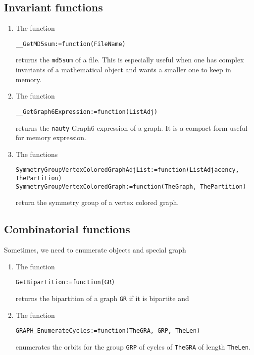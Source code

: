 \documentclass[12pt]{amsart}
\begin{document}
\subsection{Invariant functions}

\begin{enumerate}
\item The function
\begin{verbatim}
__GetMD5sum:=function(FileName)
\end{verbatim}
returns the {\tt md5sum} of a file.
This is especially useful when one has complex
invariants of a mathematical object and wants a smaller one to keep in memory.
\item The function
\begin{verbatim}
__GetGraph6Expression:=function(ListAdj)
\end{verbatim}
returns the {\tt nauty} Graph6 expression of a graph.
It is a compact form useful for memory expression.
\item The functions
\begin{verbatim}
SymmetryGroupVertexColoredGraphAdjList:=function(ListAdjacency, ThePartition)
SymmetryGroupVertexColoredGraph:=function(TheGraph, ThePartition)
\end{verbatim}
return the symmetry group of a vertex colored graph.

\end{enumerate}







\subsection{Combinatorial functions}

Sometimes, we need to enumerate objects and special graph

\begin{enumerate}
\item The function
\begin{verbatim}
GetBipartition:=function(GR)
\end{verbatim}
returns the bipartition of a graph {\tt GR} if it is bipartite and 
\item The function
\begin{verbatim}
GRAPH_EnumerateCycles:=function(TheGRA, GRP, TheLen)
\end{verbatim}
enumerates the orbits for the group {\tt GRP} of cycles of {\tt TheGRA}
of length {\tt TheLen}.
\end{enumerate}
\end{document}
